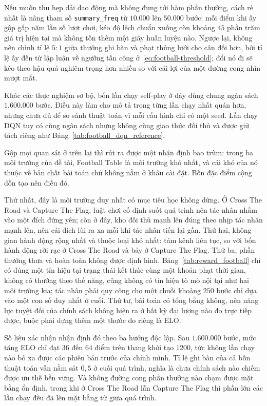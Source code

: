 \indent Nếu muốn thu hẹp dải dao động mà không đụng tới hàm phần thưởng, cách rẻ nhất là nâng
tham số \texttt{summary\_freq} từ $10.000$ lên $50.000$ bước: mỗi điểm khi ấy gộp gấp năm lần
số lượt chơi, kéo độ lệch chuẩn xuống còn khoảng $45$ phần trăm giá trị hiện tại mà không tốn
thêm một giây huấn luyện nào. Ngược lại, không nên chỉnh tỉ lệ $5{:}1$ giữa thưởng ghi bàn và
phạt thủng lưới cho cân đối hơn, bởi tỉ lệ ấy đến từ lập luận về ngưỡng tấn công
ở~\eqref{eq:football-threshold}; đổi nó đi sẽ kéo theo hậu quả nghiêm trọng hơn nhiều so với
cái lợi của một đường cong nhìn mượt mắt.

\indent Khác các thực nghiệm sơ bộ, bốn lần chạy self-play ở đây dùng chung ngân sách
$1.600.000$ bước. Điều này làm cho mô tả trong từng lần chạy nhất quán hơn, nhưng chưa đủ
để so sánh thuật toán vì mỗi cấu hình chỉ có một seed. Lần chạy DQN tuy có cùng ngân sách
nhưng không cùng giao thức đối thủ và được giữ tách riêng như Bảng~\ref{tab:football_dqn_reference}.

\indent Gộp mọi quan sát ở trên lại thì rút ra được một nhận định bao trùm: trong ba môi
trường của đề tài, Football Table là môi trường khó nhất, và cái khó của nó thuộc về bản chất
bài toán chứ không nằm ở khâu cài đặt. Bốn đặc điểm cộng dồn tạo nên điều đó.

\indent Thứ nhất, đây là môi trường duy nhất có mục tiêu học không dừng. Ở Cross The Road và
Capture The Flag, luật chơi cố định suốt quá trình nên tác nhân nhắm vào một đích đứng yên;
còn ở đây, kho đối thủ mạnh lên đúng theo nhịp tác nhân mạnh lên, nên cái đích lùi ra xa mỗi
khi tác nhân tiến lại gần. Thứ hai, không gian hành động rộng nhất và thuộc loại khó nhất:
tám kênh liên tục, so với bốn hành động rời rạc ở Cross The Road và bảy ở Capture The Flag.
Thứ ba, phần thưởng thưa và hoàn toàn không được định hình. Bảng~\ref{tab:reward_football}
chỉ có đúng một tín hiệu tại trạng thái kết thúc cùng một khoản phạt thời gian, không có
thưởng theo thế năng, cũng không có tín hiệu tò mò nội tại như hai môi trường kia; tác nhân
phải quy công cho một chuỗi khoảng $250$ bước chỉ dựa vào một con số duy nhất ở cuối. Thứ tư,
bài toán có tổng bằng không, nên năng lực tuyệt đối của chính sách không hiện ra ở bất kỳ đại
lượng nào đo trực tiếp được, buộc phải dựng thêm một thước đo riêng là ELO.

\indent Số liệu xác nhận nhận định đó theo ba hướng độc lập. Sau $1.600.000$ bước, mức tăng
ELO chỉ đạt $36$ đến $64$ điểm trên thang khởi tạo $1200$, tức không lần chạy nào bỏ xa được
các phiên bản trước của chính mình. Tỉ lệ ghi bàn của cả bốn thuật toán vẫn nằm sát $0{,}5$ ở
cuối quá trình, nghĩa là chưa chính sách nào chiếm được ưu thế bền vững. Và không đường cong
phần thưởng nào chạm được mặt bằng ổn định, trong khi ở Cross The Road lẫn Capture The Flag
thì phần lớn các lần chạy đều đã lên mặt bằng từ giữa quá trình.

